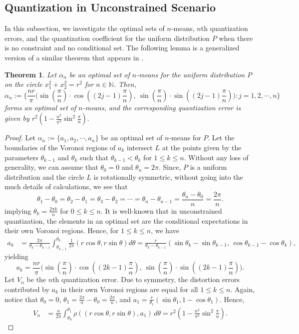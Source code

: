 \documentclass[12pt, reqno]{amsart}
\theoremstyle{plain}
\newtheorem{theorem1}[subsubsection]{Theorem}
\theoremstyle{definition}
\newcommand{\set}[1]{\{#1\}}%
\newcommand{\ga}{\alpha}
\newcommand{\gq}{\theta}
\newcommand{\D}[1]{\mathbb{#1}}%
\begin{document}
 \subsection{Quantization in Unconstrained Scenario}
In this subsection, we investigate the optimal sets of $n$-means, $n$th quantization errors, and the quantization coefficient for the uniform distribution $P$ when there is no constraint and no conditional set. The following lemma is a generalized version of a similar theorem that appears in \cite{RR}.   
\begin{theorem1} \label{theo452}
Let $\ga_n$ be an optimal set of $n$-means for the uniform distribution $P$ on the circle $x_1^2+x_2^2=r^2$ for $n\in\D N$. Then,
\[\ga_n:=\Big\{ \frac {nr}{ \pi} \Big(\sin (\frac \pi n) \cdot \cos ((2j-1){\frac \pi n}), \   \sin (\frac \pi n) \cdot \sin ((2j-1){\frac \pi n})\Big) : j=1, 2, \cdots, n \Big  \} \]
forms an optimal set of $n$-means, and the corresponding quantization error is given by $r^2(1-\frac{n^2}{\pi^2}  \sin^2\frac{\pi }{n}).$
\end{theorem1}
\begin{proof}
Let $\ga_n:=\set{a_1, a_2, \cdots, a_n}$ be an optimal set of $n$-means for $P$. Let the boundaries of the Voronoi regions of $a_k$ intersect $L$ at the points given by the parameters $\gq_{k-1}$ and $\gq_k$ such that $\gq_{k-1}<\gq_k$ for $1\leq k\leq n$. Without any loss of generality, we can assume that $\gq_0=0$ and $\gq_n=2\pi$. Since, $P$ is a uniform distribution and the circle $L$ is rotationally symmetric, without going into the much details of calculations, we see that  
\begin{equation*} \gq_1-\gq_0=\gq_2-\gq_1=\gq_3-\gq_2=\cdots=\gq_n-\gq_{n-1}=\frac{\gq_n-\gq_0}{n}=\frac{2\pi}{n}.
\end{equation*}
implying $\gq_k=\frac {2\pi k}{n}$ for $0\leq k\leq n$. 
It is well-known that in unconstrained quantization, the elements in an optimal set are the conditional expectations in their own Voronoi regions.  Hence, for $1\leq k\leq n$, we have 
 \begin{align*}
a_k&=\frac {2 \pi}  {\gq_{k}-\gq_{k-1}} \int_{\gq_{k-1}}^{\gq_k} \frac 1 {2\pi}( r\cos \gq, r\sin \gq) d\gq=\frac r {\gq_k-\gq_{k-1}} \left(\sin \gq_{k}-\sin\gq_{k-1}, \, \cos\gq_{k-1}-\cos \gq_k\right), 
\end{align*}
yielding \[ a_k=\frac {nr}{ \pi} \Big(\sin (\frac \pi n) \cdot \cos ((2k-1){\frac \pi n}), \   \sin (\frac \pi n) \cdot \sin ((2k-1){\frac \pi n})\Big).\]
Let $V_n$ be the $n$th quantization error. Due to symmetry, the distortion errors contributed by $a_k$ in their own Voronoi regions are equal for all $1\leq k\leq n$. Again, notice that $\gq_0=0$, $\gq_1=\frac{2\pi}{n}-\gq_0=\frac {2\pi} n$, and $a_1=\frac r{\gq_1}(\sin \gq_1, 1-\cos \gq_1)$. Hence, 
\begin{align*}
V_n&= \frac n{2\pi}\int_{\gq_0}^{\gq_1} \rho((r\cos \gq, r\sin \gq), a_1) \, d \gq =r^2(1-\frac{n^2}{\pi^2}  \sin^2\frac{\pi }{n}).
\end{align*} 
\end{proof} 
\end{document}
